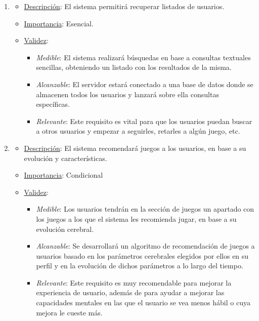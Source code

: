\begin{enumerate}
\item %
  \begin{itemize}
  \item \underline{Descripción}: El sistema permitirá recuperar listados de usuarios.
  \item \underline{Importancia}: Esencial.
  \item \underline{Validez}:
    \begin{itemize}
    \item \textit{Medible}: El sistema realizará búsquedas en base a consultas textuales sencillas, obteniendo un listado con los resultados de la misma.
    \item \textit{Alcanzable}: El servidor estará conectado a una base de datos donde se almacenen todos los usuarios y lanzará sobre ella consultas específicas.
    \item \textit{Relevante}: Este requisito es vital para que los usuarios puedan buscar a otros usuarios y empezar a seguirles, retarles a algún juego, etc.
    \end{itemize}
  \end{itemize}

\item %
  \begin{itemize}
  \item \underline{Descripción}: El sistema recomendará juegos a los usuarios, en base a su evolución y características.
  \item \underline{Importancia}: Condicional
  \item \underline{Validez}:
    \begin{itemize}
    \item \textit{Medible}: Los usuarios tendrán en la sección de juegos un apartado con los juegos a los que el sistema les recomienda jugar, en base a su evolución cerebral.
    \item \textit{Alcanzable}: Se desarrollará un algoritmo de recomendación de juegos a usuarios basado en los parámetros cerebrales elegidos por ellos en su perfil y en la evolución de dichos parámetros a lo largo del tiempo.
    \item \textit{Relevante}: Este requisito es muy recomendable para mejorar la experiencia de usuario, además de para ayudar a mejorar las capacidades mentales en las que el usuario se vea menos hábil o cuya mejora le cueste más.
    \end{itemize}
  \end{itemize}


\end{enumerate}
